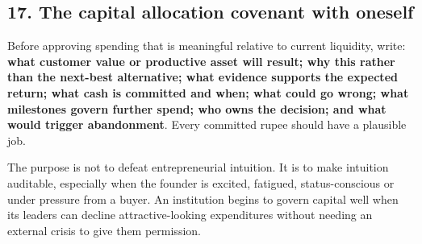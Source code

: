 \subsection{17. The capital allocation covenant with oneself}


Before approving spending that is meaningful relative to current liquidity, write: \textbf{what customer value or productive asset will result; why this rather than the next-best alternative; what evidence supports the expected return; what cash is committed and when; what could go wrong; what milestones govern further spend; who owns the decision; and what would trigger abandonment}. Every committed rupee should have a plausible job.

The purpose is not to defeat entrepreneurial intuition. It is to make intuition auditable, especially when the founder is excited, fatigued, status-conscious or under pressure from a buyer. An institution begins to govern capital well when its leaders can decline attractive-looking expenditures without needing an external crisis to give them permission.

